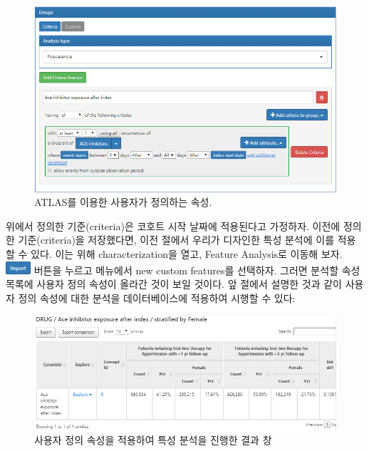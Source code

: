 \documentclass[11pt]{book}
\theoremstyle{definition}
\theoremstyle{definition}
\theoremstyle{definition}
\theoremstyle{remark}
\begin{document}
\begin{figure}

{\centering \includegraphics[width=1\linewidth]{images/Characterization/atlasCharacterizationCustomFeature} 

}

\caption{ATLAS를 이용한 사용자가 정의하는 속성.}\label{fig:atlasCharacterizationCustomFeature}
\end{figure}

위에서 정의한 기준(criteria)은 코호트 시작 날짜에 적용된다고 가정하자.
이전에 정의한 기준(criteria)을 저장했다면, 이전 절에서 우리가 디자인한
특성 분석에 이를 적용할 수 있다. 이는 위해 characterization을 열고,
Feature Analysis로 이동해 보자.
\includegraphics{images/Characterization/atlasImportButton.png} 버튼을
누르고 메뉴에서 new custom features를 선택하자. 그러면 분석할 속성
목록에 사용자 정의 속성이 올라간 것이 보일 것이다. 앞 절에서 설명한 것과
같이 사용자 정의 속성에 대한 분석을 데이터베이스에 적용하여 시행할 수
있다:

\begin{figure}

{\centering \includegraphics[width=1\linewidth]{images/Characterization/atlasCharacterizationCustomFeatureResults} 

}

\caption{사용자 정의 속성을 적용하여 특성 분석을 진행한 결과 창}\label{fig:atlasCharacterizationCustomFeatureResults}
\end{figure}
\end{document}
